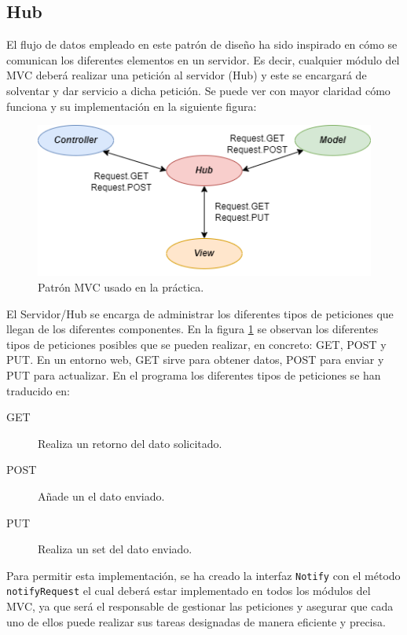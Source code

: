 \subsection{Hub}

El flujo de datos empleado en este patrón de diseño ha sido inspirado en cómo se comunican los diferentes elementos en un servidor. Es decir, cualquier módulo del MVC deberá realizar una petición al servidor (Hub) y este se encargará de solventar y dar servicio a dicha petición. Se puede ver con mayor claridad cómo funciona y su implementación en la siguiente figura:\bigskip

\begin{figure}[!h]
    \centering
    \includegraphics[width=\linewidth]{MVC/img/flujocom.png}
    \caption{Patrón MVC usado en la práctica.}
    \label{fig:flujo_datos}
\end{figure}

El Servidor/Hub se encarga de administrar los diferentes tipos de peticiones que llegan de los diferentes componentes. En la figura \ref{fig:flujo_datos} se observan los diferentes tipos de peticiones posibles que se pueden realizar, en concreto: GET, POST y PUT. En un entorno web, GET sirve para obtener datos, POST para enviar y PUT para actualizar. En el programa los diferentes tipos de peticiones se han traducido en: \medskip

\begin{description}
    \item[GET  ] Realiza un retorno del dato solicitado.
    \item[POST] Añade un el dato enviado.
    \item[PUT  ] Realiza un set del dato enviado.
\end{description}\medskip

Para permitir esta implementación, se ha creado la interfaz \texttt{Notify} con el método \texttt{notifyRequest} el cual deberá estar implementado en todos los módulos del MVC, ya que será el responsable de gestionar las peticiones y asegurar que cada uno de ellos puede realizar sus tareas designadas de manera eficiente y precisa.
